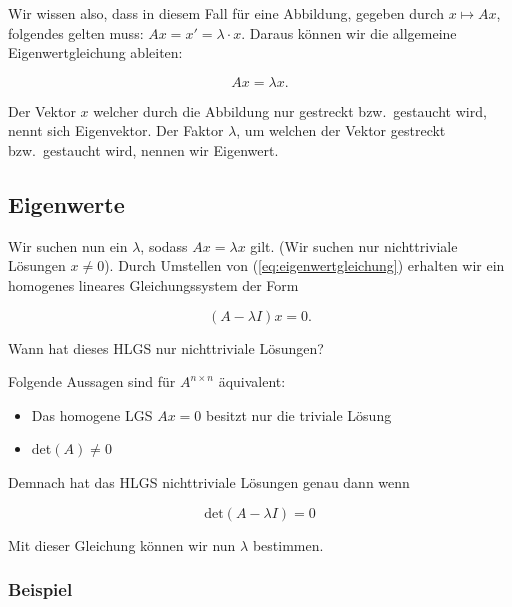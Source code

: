 Wir wissen also, dass in diesem Fall für eine Abbildung, gegeben durch \( x \mapsto Ax \), folgendes gelten muss: \( Ax = x' = \lambda \cdot x \). Daraus können wir die allgemeine Eigenwertgleichung ableiten:

\begin{equation}
    Ax = \lambda x.
    \label{eq:eigenwertgleichung}
\end{equation}

Der Vektor \(x \) welcher durch die Abbildung nur gestreckt bzw.\ gestaucht wird, nennt sich Eigenvektor. Der Faktor \( \lambda \), um welchen der Vektor gestreckt bzw.\ gestaucht wird, nennen wir Eigenwert.

\subsection{Eigenwerte}

Wir suchen nun ein \( \lambda \), sodass \( Ax = \lambda x \) gilt. (Wir suchen nur nichttriviale Lösungen \(x \neq 0\)). Durch Umstellen von (\ref{eq:eigenwertgleichung})  erhalten wir ein homogenes lineares Gleichungssystem der Form

\begin{equation}
    (A - \lambda I) x = 0.
    \label{eq:eigenwertgleichung_homogen}
\end{equation}

Wann hat dieses HLGS nur nichttriviale Lösungen? 

\begin{tcolorbox}[colback=gray!30, colframe=gray!80, title=Recall von Lineare Algebra I]
    Folgende Aussagen sind für \( A^{n \times n} \) äquivalent:
    \begin{itemize}
        \item Das homogene LGS \( Ax = 0 \) besitzt nur die triviale Lösung 
        \item det\( (A) \neq 0 \)
    \end{itemize}
\end{tcolorbox}

Demnach hat das HLGS nichttriviale Lösungen genau dann wenn 

\begin{equation*}
    \text{det}(A - \lambda I) = 0
\end{equation*}

Mit dieser Gleichung können wir nun \( \lambda \) bestimmen.

\subsubsection*{Beispiel}

